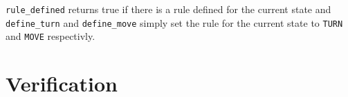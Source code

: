 \documentclass{article}
\begin{document}
    \texttt{rule\_defined} returns true if there is a rule defined for the current state and \texttt{define\_turn} and \texttt{define\_move} simply set the rule for the current state to \texttt{TURN} and \texttt{MOVE} respectivly.




\section{Verification}

\end{document}
